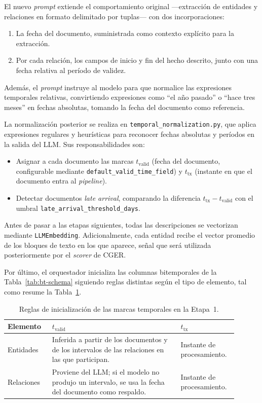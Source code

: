 El nuevo \emph{prompt} extiende el comportamiento original ---extracción de entidades y relaciones en formato delimitado por tuplas--- con dos incorporaciones:

\begin{enumerate}[label=(\alph*)]
  \item La fecha del documento, suministrada como contexto explícito para la extracción.
  \item Por cada relación, los campos de inicio y fin del hecho descrito, junto con una fecha relativa al período de validez.
\end{enumerate}

Además, el \emph{prompt} instruye al modelo para que normalice las expresiones temporales relativas, convirtiendo expresiones como ``el año pasado'' o ``hace tres meses'' en fechas absolutas, tomando la fecha del documento como referencia.

La normalización posterior se realiza en \texttt{temporal\_normalization.py}, que aplica expresiones regulares y heurísticas para reconocer fechas absolutas y períodos en la salida del LLM. Sus responsabilidades son:

\begin{itemize}
  \item Asignar a cada documento las marcas $t_{\text{valid}}$ (fecha del documento, configurable mediante \texttt{default\_valid\_time\_field}) y $t_{\text{tx}}$ (instante en que el documento entra al \emph{pipeline}).
  \item Detectar documentos \emph{late arrival}, comparando la diferencia $t_{\text{tx}} - t_{\text{valid}}$ con el umbral \texttt{late\_arrival\_threshold\_days}.
\end{itemize}

Antes de pasar a las etapas siguientes, todas las descripciones se vectorizan mediante \texttt{LLMEmbedding}. Adicionalmente, cada entidad recibe el vector promedio de los bloques de texto en los que aparece, señal que será utilizada posteriormente por el \emph{scorer} de CGER.

Por último, el orquestador inicializa las columnas bitemporales de la Tabla~\ref{tab:bt-schema} siguiendo reglas distintas según el tipo de elemento, tal como resume la Tabla~\ref{tab:impl-temporal-init}.

\begin{table}[H]
\centering
\small
\begin{tabular}{p{0.18\linewidth}p{0.52\linewidth}p{0.20\linewidth}}
\hline
\textbf{Elemento} & \textbf{$t_{\text{valid}}$} & \textbf{$t_{\text{tx}}$} \\ \hline
Entidades & Inferida a partir de los documentos y de los intervalos de las relaciones en las que participan. & Instante de procesamiento. \\
Relaciones & Proviene del LLM; si el modelo no produjo un intervalo, se usa la fecha del documento como respaldo. & Instante de procesamiento. \\ \hline
\end{tabular}
\caption{Reglas de inicialización de las marcas temporales en la Etapa~1.}
\label{tab:impl-temporal-init}
\end{table}

